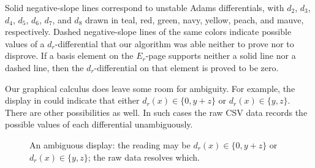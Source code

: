 \documentclass[dvipsnames,table]{amsart}
\theoremstyle{definition}
\theoremstyle{remark}
\numberwithin{equation}{section}
\begin{document}
\medskip
\noindent Solid negative-slope lines correspond to unstable Adams differentials, with $d_2$, $d_3$, $d_4$, $d_5$, $d_6$, $d_7$, and $d_8$ drawn in {\color{CtpTeal}teal}, {\color{CtpRed}red}, {\color{CtpGreen}green}, {\color{CtpBlue}navy}, {\color{CtpYellow}yellow}, {\color{CtpPeach}peach}, and {\color{CtpMauve}mauve}, respectively. Dashed negative-slope lines of the same colors indicate possible values of a $d_r$-differential that our algorithm was able neither to prove nor to disprove. If a basis element on the $E_r$-page supports neither a solid line nor a dashed line, then the $d_r$-differential on that element is proved to be zero.

\medskip
\noindent Our graphical calculus does leave some room for ambiguity. For example, the display in  could indicate that either $d_r(x) \in \{0, y + z\}$ or $d_r(x) \in \{y, z\}$. There are other possibilities as well. In such cases the raw CSV data records the possible values of each differential unambiguously.

\begin{figure}[H]
\centering
{}
\caption{An ambiguous display: the reading may be $d_r(x) \in \{0, y + z\}$ or $d_r(x) \in \{y, z\}$; the raw data resolves which.}
\label{fig:chart-ambiguity}
\end{figure}
\end{document}
